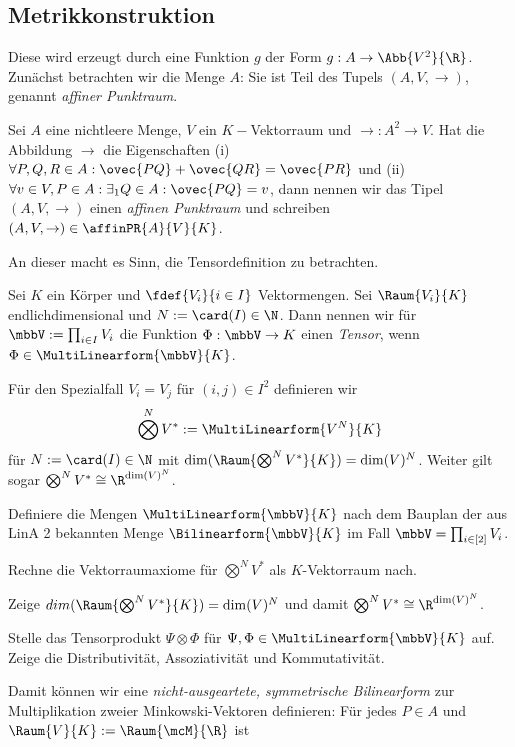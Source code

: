 \documentclass[../WiSe22ANA3.tex]{subfiles}
\begin{document}
			\subsection*{Metrikkonstruktion}
				Diese wird erzeugt durch eine Funktion $g$ der Form $g:A\to\Abb{V^2}{\R}$. Zunächst betrachten wir die Menge $A$: Sie ist Teil des Tupels $(A,V,\rightarrow)$, genannt \emph{affiner Punktraum}. 
				\begin{info}
					Sei $A$ eine nichtleere Menge, $V$ ein $K-$Vektorraum und $\rightarrow:A^2\to V$. Hat die Abbildung $\rightarrow$ die Eigenschaften (i) $\forall P,Q,R\in A:\ovec{PQ}+\ovec{QR}=\ovec{PR}$ und (ii) $\forall v\in V,P\in A:\exists_1 Q\in A:\ovec{PQ}=v$, dann nennen wir das Tipel $(A,V,\rightarrow)$ einen \emph{affinen Punktraum} und schreiben $(A,V,\rightarrow)\in\affinPR{A}{V}{K}$. 
				\end{info} 
				\noindent An dieser macht es Sinn, die Tensordefinition zu betrachten.
				\begin{info}
					Sei $K$ ein Körper und $\fdef{V_i}{i\in I}$ Vektormengen. Sei $\Raum{V_i}{K}$ endlichdimensional und $N:=\card(I)\in\N$. Dann nennen wir für $\mbbV:=\prod_{i\in I}V_i$ die Funktion $\Phi:\mbbV\to K$ einen \emph{Tensor}, wenn $\Phi\in\MultiLinearform{\mbbV}{K}$. 
				\end{info}
				\noindent Für den Spezialfall $V_i=V_j$ für $(i,j)\in I^2$ definieren wir 
				$$\bigotimes^NV^*:=\MultiLinearform{V^N}{K}$$
				für $N:=\card(I)\in\N$ mit $\dim(\Raum{\bigotimes^NV^*}{K})=\dim(V)^N$. Weiter gilt sogar $\bigotimes^NV^*\cong\R^{\dim(V)^N}$. 
				\begin{Aufgabe}
					\nr Definiere die Mengen $\MultiLinearform{\mbbV}{K}$ nach dem Bauplan der aus LinA 2 bekannten Menge $\Bilinearform{\mbbV}{K}$ im Fall $\mbbV=\prod_{i\in[2]}V_i$.
					
					\nr Rechne die Vektorraumaxiome für $\bigotimes^NV^*$ als $K$-Vektorraum nach. 
					
					\nr Zeige $dim(\Raum{\bigotimes^NV^*}{K})=\dim(V)^N$ und damit $\bigotimes^NV^*\cong\R^{\dim(V)^N}$. 
					
					\nr Stelle das Tensorprodukt $\Psi\otimes\Phi$ für $\Psi,\Phi\in\MultiLinearform{\mbbV}{K}$ auf. Zeige die Distributivität, Assoziativität und Kommutativität. 
				\end{Aufgabe}
				\noindent Damit können wir eine \emph{nicht-ausgeartete, symmetrische Bilinearform} zur Multiplikation zweier Minkowski-Vektoren definieren: Für jedes $P\in A$ und $\Raum{V}{K}:=\Raum{\mcM}{\R}$ ist 
\end{document}
